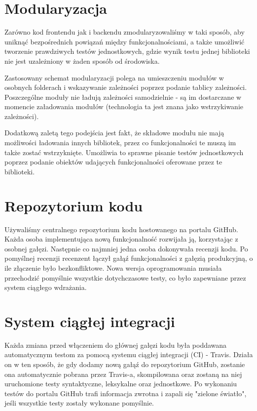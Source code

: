 \documentclass[a4paper,twoside,openright,11pt]{report}
\begin{document}
  \section{Modularyzacja}
\par Zarówno kod frontendu jak i backendu zmodularyzowaliśmy w taki sposób, aby uniknąć bezpośrednich powiązań między funkcjonalnościami, a także umożliwić tworzenie prawdziwych testów
jednostkowych, gdzie wynik testu jednej biblioteki nie jest uzależniony w żaden sposób od środowiska. 
\par Zastosowany schemat modularyzacji polega na umieszczeniu modułów w osobnych folderach i wskazywanie zależności poprzez podanie tablicy zależności. Poszczególne moduły nie ładują zależności samodzielnie - są im dostarczane w momencie załadowania modułów (technologia ta jest znana jako wstrzykiwanie zależności).
\par Dodatkową zaletą tego podejścia jest fakt, że składowe modułu nie mają możliwości ładowania innych bibliotek, przez co funkcjonalności te muszą im także zostać wstrzyknięte. Umożliwia to
sprawne pisanie testów jednostkowych poprzez podanie obiektów udających funkcjonalności oferowane przez te biblioteki.

  \section{Repozytorium kodu}
\par Używaliśmy centralnego repozytorium kodu hostowanego na portalu GitHub. \cite{repozytorium} Każda osoba implementująca nową funkcjonalność rozwijała ją, korzystając z osobnej gałęzi. Następnie co najmniej jedna osoba dokonywała recenzji kodu. Po pomyślnej recenzji recenzent łączył gałąź funkcjonalności z gałęzią produkcyjną, o ile złączenie było bezkonfliktowe. Nowa wersja oprogramowania musiała przechodzić pomyślnie wszystkie dotychczasowe testy, co było zapewniane przez system ciągłego wdrażania. 

  \section{System ciągłej integracji}
\par Każda zmiana przed włączeniem do głównej gałęzi kodu była poddawana automatycznym testom za pomocą systemu ciągłej integracji (CI) - Travis. \cite{travis} Działa on w ten sposób, że gdy dodamy nową gałąź do repozytorium GitHub, zostanie ona automatycznie pobrana przez Travis-a, skompilowana oraz zostaną na niej uruchomione testy syntaktyczne, leksykalne oraz jednostkowe. Po wykonaniu testów do portalu GitHub trafi informacja zwrotna i zapali się "zielone światło", jeśli wszystkie testy zostały wykonane pomyślnie. 
\end{document}
